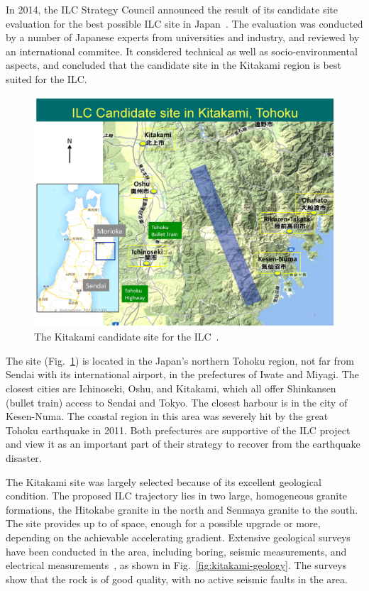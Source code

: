 In 2014, the ILC Strategy Council announced the result of its candidate site evaluation for the best possible ILC site in Japan~\cite{ILCSC:2014a}.
The evaluation was conducted by a number of Japanese experts from universities and industry, and reviewed by an international commitee. 
It considered technical as well as socio-environmental aspects, and concluded that the candidate site in the Kitakami region is best suited for the ILC.

\begin{figure}[htbp]
   \includegraphics[width=\hsize]{chapters/figures/ILC-Candidate-Area2}
\caption{The Kitakami candidate site for the ILC~\cite{Warmbein:2014a}.}
\label{fig:kitakami-site}
\end{figure}

The site (Fig.~\ref{fig:kitakami-site}) is located in the Japan's northern Tohoku region, not far from Sendai with its international airport, in the prefectures of Iwate and Miyagi.
The closest cities are Ichinoseki, Oshu, and Kitakami, which all offer Shinkansen (bullet train) access to Sendai and Tokyo.
The closest harbour is in the city of Kesen-Numa.
The coastal region in this area was severely hit by the great Tohoku earthquake in 2011. 
Both prefectures are supportive of the ILC project and view it as an important part of their strategy to recover from the earthquake disaster.

The Kitakami site was largely selected because of its excellent geological condition. 
The proposed ILC trajectory lies in two large, homogeneous granite formations, the Hitokabe granite in the north and Senmaya granite to the south.
The site provides up to  of space, enough for a possible  upgrade or more, depending on the achievable accelerating gradient.  
Extensive geological surveys have been conducted in the area, including boring, seismic measurements, and electrical measurements~\cite{Sanuki:2015a}, as shown in Fig.~\ref{fig:kitakami-geology}.
The surveys show that the rock is of good quality, with no active seismic faults in the area.


